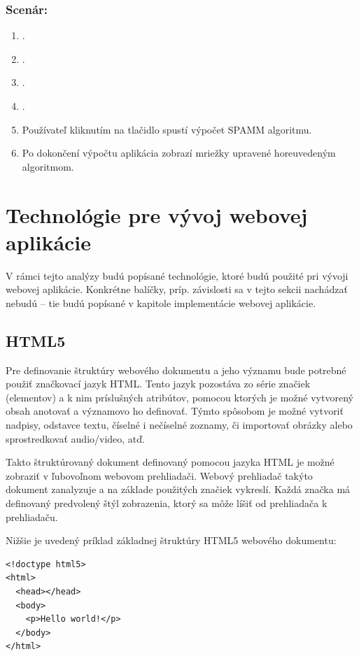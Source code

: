 \clearpage

\subsubsection*{Scenár:}
\begin {enumerate}
\item {}.
\item {}.
\item {}.
\item {}.
\item {Používateľ kliknutím na tlačidlo  spustí výpočet SPAMM algoritmu.}
\item {Po dokončení výpočtu aplikácia zobrazí mriežky upravené horeuvedeným algoritmom.}
\end {enumerate}

\section {Technológie pre vývoj webovej aplikácie}
V rámci tejto analýzy budú popísané technológie, ktoré budú použité pri vývoji webovej aplikácie. Konkrétne balíčky, príp. závislosti sa v tejto sekcii nachádzať nebudú -- tie budú popísané v kapitole implementácie webovej aplikácie.

\subsection {HTML5}
Pre definovanie štruktúry webového dokumentu a jeho významu bude potrebné použiť značkovací jazyk HTML. Tento jazyk pozostáva zo série značiek (elementov) a k nim príslušných atribútov, pomocou ktorých je možné vytvorený obsah anotovať a významovo ho definovať. Týmto spôsobom je možné vytvoriť nadpisy, odstavce textu, číselné i nečíselné zoznamy, či importovať obrázky alebo sprostredkovať audio/video, atď.

Takto štruktúrovaný dokument definovaný pomocou jazyka HTML je možné zobraziť v ľubovoľnom webovom prehliadači. Webový prehliadač takýto dokument zanalyzuje a na základe použitých značiek vykreslí. Každá značka má definovaný predvolený štýl zobrazenia, ktorý sa môže líšiť od prehliadača k prehliadaču.

\clearpage

Nižšie je uvedený príklad základnej štruktúry HTML5 webového dokumentu:

\begin{minipage}[]{\linewidth}
\begin{verbatim}
<!doctype html5>
<html>
  <head></head>
  <body>
    <p>Hello world!</p>
  </body>
</html>
\end{verbatim}
\end{minipage}

